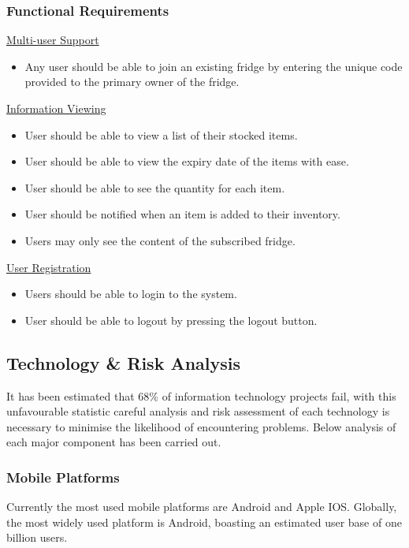 \documentclass[a4paper, 11pt]{article}
\begin{document}
\vspace{\baselineskip}

\subsubsection{Functional Requirements}
\underline{Multi-user Support}
\begin{itemize}
  \item Any user should be able to join an existing fridge by entering the unique code provided to the primary owner of the fridge.
\end{itemize}
\underline{Information Viewing}
\begin{itemize}
  \item User should be able to view a list of their stocked items.
  \item User should be able to view the expiry date of the items with ease. 
  \item User should be able to see the quantity for each item.
  \item User should be notified when an item is added to their inventory.
  \item Users may only see the content of the subscribed fridge.
\end{itemize}
\underline{User Registration}
\begin{itemize}
  \item Users should be able to login to the system. 
  \item User should be able to logout by pressing the logout button.
\end{itemize}



\subsection{Technology \& Risk Analysis}
It has been estimated that 68\% of information technology projects fail, with this unfavourable statistic careful analysis and risk assessment of each technology is necessary to minimise the likelihood of encountering problems. Below analysis of each major component has been carried out.

\subsubsection{Mobile Platforms}
Currently the most used mobile platforms are Android and Apple IOS. Globally, the most widely used platform is Android, boasting an estimated user base of one billion users. 
\end{document}
